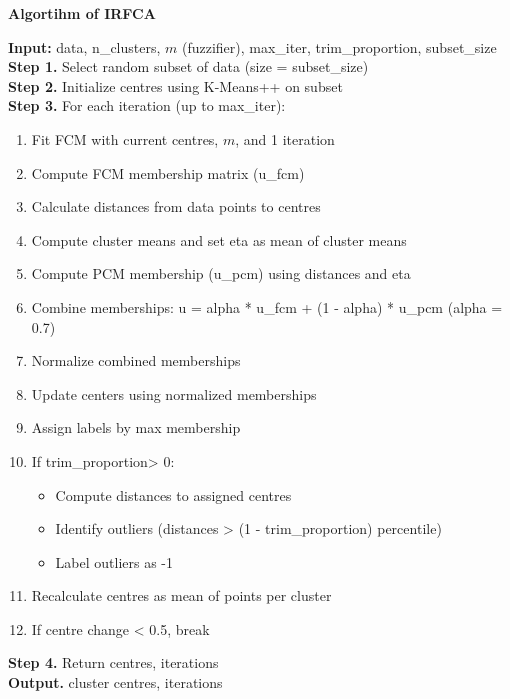 \documentclass[twoside,11pt]{article}
\begin{document}
\begin{center}
\begin{minipage}{0.8\textwidth} %
\justifying
    \begin{center}
    \textbf{Algortihm of IRFCA}    
    \end{center}
\textbf{Input:} data, n\_clusters, $m$ (fuzzifier), max\_iter, trim\_proportion, subset\_size\\
\textbf{Step 1.} Select random subset of data (size = subset\_size)\\
\textbf{Step 2.} Initialize centres using K-Means++ on subset\\
\textbf{Step 3.} For each iteration (up to max\_iter):
\begin{enumerate}[label=\alph*), leftmargin=1.5cm, nosep]
    \item Fit FCM with current centres, $m$, and 1 iteration
    \item Compute FCM membership matrix (u\_fcm)
    \item Calculate distances from data points to centres
    \item Compute cluster means and set eta as mean of cluster means
    \item Compute PCM membership (u\_pcm) using distances and eta
    \item Combine memberships: u = alpha * u\_fcm + (1 - alpha) * u\_pcm (alpha = 0.7)
    \item Normalize combined memberships
    \item Update centers using normalized memberships
    \item Assign labels by max membership
    \item If trim\_proportion> 0:
    \begin{itemize}[nosep]
        \item Compute distances to assigned centres
        \item Identify outliers (distances > (1 - trim\_proportion) percentile)
        \item Label outliers as -1
    \end{itemize}
    \item Recalculate centres as mean of points per cluster
    \item If centre change < 0.5, break
\end{enumerate}
\textbf{Step 4.} Return centres, iterations\\
\textbf{Output.} cluster centres, iterations
\end{minipage}
\end{center}
\end{document}
